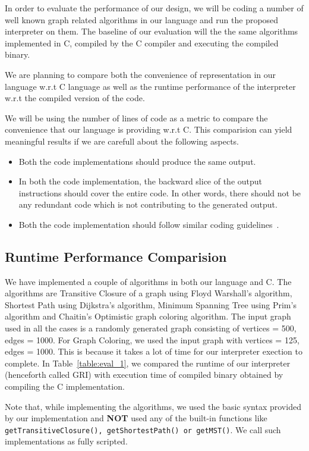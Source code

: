 In order to evaluate the performance of our design, we will be coding a number 
of well known graph related algorithms in our language and run the proposed interpreter on 
them. The baseline of our evaluation will the the same algorithms implemented in 
C,  compiled by the C compiler and executing the compiled binary.

We are planning to compare both the convenience of representation in our 
language w.r.t C language as well as the runtime performance of the interpreter 
w.r.t the compiled version of the code.

We will be using the number of lines of code as a metric to compare the 
convenience that our language is providing w.r.t C. This comparision can yield 
meaningful results if we are carefull about the following aspects.
\begin{itemize}
  \item Both the code implementations should produce the same output.
  \item In both the code implementation, the backward slice of the output instructions should cover the entire 
  code. In other words, there should not be any redundant code which is not 
  contributing to the generated output. 
  \item Both the code implementation should follow similar coding 
  guidelines~\cite{GNU}.
\end{itemize}

\subsection{Runtime Performance Comparision}

We have implemented a couple of algorithms in both our language and C. The 
algorithms are Transitive Closure of a graph using Floyd Warshall's algorithm, 
           Shortest Path using Dijkstra's algorithm, Minimum Spanning Tree using 
           Prim's algorithm and Chaitin's Optimistic graph coloring algorithm.
The input graph used in all the cases is a randomly generated graph consisting  of vertices = 500, edges = 1000. 
For Graph Coloring, we used the input graph with vertices = 125, edges = 1000. This is 
because it takes a lot of time for our interpreter exection to complete.
In Table~\ref{table:eval_1}, we compared the runtime of our interpreter 
(henceforth called GRI) with 
execution time of compiled binary obtained by compiling the C implementation.

Note that, while implementing the algorithms, we used the basic syntax provided 
by our implementation and \textbf{NOT} used any of the  built-in 
functions like {\tt getTransitiveClosure(), getShortestPath() or getMST()}. 
We call such implementations as fully scripted.

